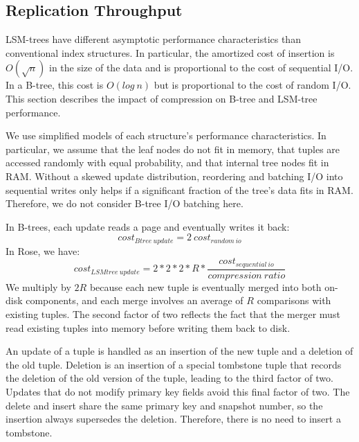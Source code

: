 \documentclass{vldb}
\newcommand{\rows}{Rose\xspace}
\begin{document}
\subsection{Replication Throughput}

LSM-trees have different asymptotic performance characteristics than
conventional index structures.  In particular, the amortized cost of
insertion is $O(\sqrt{n})$ in the size of the data and is proportional
 to the cost of sequential I/O.  In a B-tree, this cost is
$O(log~n)$ but is proportional to the cost of random I/O.
This section describes the impact of compression on B-tree
and LSM-tree performance.

We use simplified models of each structure's performance
characteristics.  In particular, we assume that the leaf nodes do not
fit in memory, that tuples are accessed randomly with equal
probability, and that internal tree nodes fit in RAM.  Without a
skewed update distribution, reordering and batching I/O into
sequential writes only helps if a significant fraction of the tree's
data fits in RAM.  Therefore, we do not consider B-tree I/O batching
here.

In B-trees, each update reads a page and eventually writes it back:
\[
   cost_{Btree~update}=2~cost_{random~io}
\]
In \rows, we have:
\[
   cost_{LSMtree~update}=2*2*2*R*\frac{cost_{sequential~io}}{compression~ratio}  %
\]
We multiply by $2R$ because each new
tuple is eventually merged into both on-disk components, and
each merge involves an average of $R$ comparisons with existing tuples.
The second factor of two reflects the fact that the merger must read
existing tuples into memory before writing them back to disk.

An update of a tuple is handled as an insertion of the new
tuple and a deletion of the old tuple.  Deletion is an insertion
of a special tombstone tuple that records the deletion of the old version of the tuple, leading to the third factor of two.
Updates that do not modify primary key fields avoid this final factor
of two.  The delete and
insert share the same primary key and snapshot number, so the
insertion always supersedes the deletion.  Therefore, there is no
need to insert a tombstone.
\end{document}
